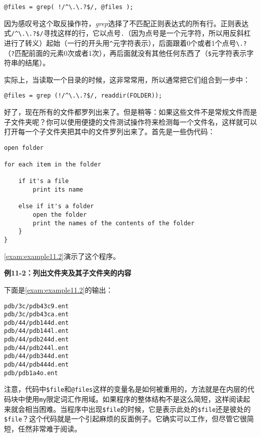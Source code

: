 \begin{lstlisting}
@files = grep( !/^\.\.?$/, @files );
\end{lstlisting}

因为感叹号这个取反操作符，\textit{grep}选择了不匹配正则表达式的所有行。正则表达式\verb|/^\.\.?$/|寻找这样的行，它以点号\verb|.|（因为点号是一个元字符，所以用反斜杠进行了转义）起始（一行的开头用\verb|^|元字符表示），后面跟着0个或者1个点号\verb|\.?|（\verb|?|匹配前面的元素0次或者1次），再后面就没有其他任何东西了（\verb|$|元字符表示字符串的结尾）。

实际上，当读取一个目录的时候，这非常常用，所以通常把它们组合到一步中：

\begin{lstlisting}
@files = grep (!/^\.\.?$/, readdir(FOLDER));
\end{lstlisting}

好了，现在所有的文件都罗列出来了。但是稍等：如果这些文件不是常规文件而是子文件夹呢？你可以使用便捷的文件测试操作符来检测每一个文件名，这样就可以打开每一个子文件夹把其中的文件罗列出来了。首先是一些伪代码：

\begin{lstlisting}
open folder

for each item in the folder

    if it's a file
        print its name

    else if it's a folder
        open the folder
        print the names of the contents of the folder
    }
}
\end{lstlisting}

\autoref{exam:example11.2}演示了这个程序。

\textbf{例11-2：列出文件夹及其子文件夹的内容}


下面是\autoref{exam:example11.2}的输出：

\begin{lstlisting}
pdb/3c/pdb43c9.ent
pdb/3c/pdb43ca.ent
pdb/44/pdb144d.ent
pdb/44/pdb144l.ent
pdb/44/pdb244d.ent
pdb/44/pdb244l.ent
pdb/44/pdb344d.ent
pdb/44/pdb444d.ent
pdb/pdb1a4o.ent
\end{lstlisting}

注意，代码中\verb|$file|和\verb|@files|这样的变量名是如何被重用的，方法就是在内层的代码块中使用\verb|my|限定词汇作用域。如果程序的整体结构不是这么简短，这样阅读起来就会相当困难。当程序中出现\verb|$file|的时候，它是表示此处的\verb|$file|还是彼处的\verb|$file|？这个代码就是一个引起麻烦的反面例子。它确实可以工作，但尽管它很简短，任然非常难于阅读。

